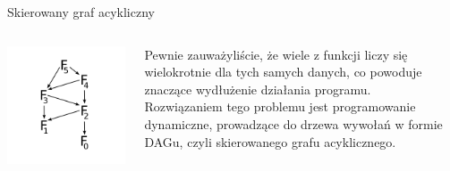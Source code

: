 \begin{frame}{Skierowany graf acykliczny}
    \centering
    \begin{columns}
        \begin{column}{0.5\textwidth}
            \includegraphics[width=1.2\textwidth,height=0.7\textheight]{graphics/recursion/fibonacci_dag.png}
        \end{column}
        \begin{column}{0.5\textwidth}
            Pewnie zauważyliście, że wiele z funkcji liczy się wielokrotnie dla tych samych danych, co powoduje znaczące wydłużenie działania programu. \\
            Rozwiązaniem tego problemu jest programowanie dynamiczne, prowadzące do drzewa wywołań w formie DAGu, czyli skierowanego grafu acyklicznego.
        \end{column}
    \end{columns}
\end{frame}
